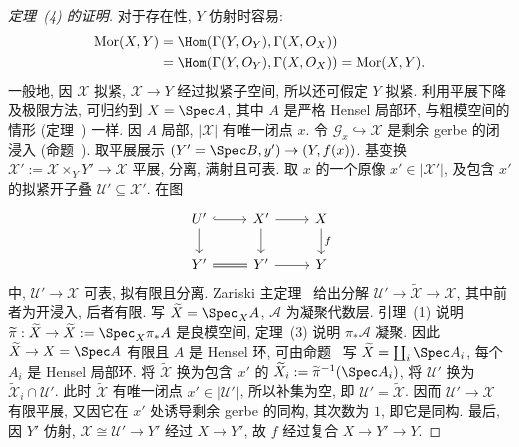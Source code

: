 \begin{proof}[定理~(4) 的证明]
对于存在性, $Y$ 仿射时容易:
\begin{align*}
\operatorname{Mor}(X,Y)&=\Hom(\Gamma(Y,\mathcal O_Y),\Gamma(X,\mathcal O_X))\\
&=\Hom(\Gamma(Y,\mathcal O_Y),\Gamma(\mathcal X,\mathcal O_{\mathcal X}))=\operatorname{Mor}(\mathcal X,Y).
\end{align*}
一般地, 因 $\mathcal X$ 拟紧, $\mathcal X\to Y$ 经过拟紧子空间, 所以还可假定 $Y$ 拟紧. 利用平展下降及极限方法, 可归约到 $X=\Spec A$, 其中 $A$ 是严格 Hensel 局部环, 与粗模空间的情形 (定理~) 一样. 因 $A$ 局部, $|\mathcal X|$ 有唯一闭点 $x$. 令 $\mathcal G_x\hookrightarrow\mathcal X$ 是剩余 gerbe 的闭浸入 (命题~). 取平展展示 $(Y'=\Spec B,y')\to(Y,f(x))$. 基变换 $\mathcal X':=\mathcal X\times_YY'\to\mathcal X$ 平展, 分离, 满射且可表. 取 $x$ 的一个原像 $x'\in|\mathcal X'|$, 及包含 $x'$ 的拟紧开子叠 $\mathcal U'\subseteq\mathcal X'$. 在图
\begin{align*}
\begin{tikzcd}[ampersand replacement=\&]
\mathcal U'\arrow[r,hook]\arrow[d]\&\mathcal X'\arrow[r]\arrow[d]\&\mathcal X\arrow[d,"{f}"]\\
Y'\arrow[r,equal]\&Y'\arrow[r]\&Y
\end{tikzcd}
\end{align*}
中, $\mathcal U'\to\mathcal X$ 可表, 拟有限且分离. Zariski 主定理~ 给出分解 $\mathcal U'\to\widetilde{\mathcal X}\to\mathcal X$, 其中前者为开浸入, 后者有限. 写 $\widetilde{\mathcal X}=\Spec_{\mathcal X}\mathcal A$, $\mathcal A$ 为凝聚代数层. 引理~(1) 说明 $\widetilde\pi:\widetilde{\mathcal X}\to\widetilde X:=\Spec_X\pi_*\mathcal A$ 是良模空间, 定理~(3) 说明 $\pi_*\mathcal A$ 凝聚. 因此 $\widetilde X\to X=\Spec A$ 有限且 $A$ 是 Hensel 环, 可由命题~ 写 $\widetilde X=\coprod_i\Spec A_i$, 每个 $A_i$ 是 Hensel 局部环. 将 $\widetilde{\mathcal X}$ 换为包含 $x'$ 的 $\widetilde{\mathcal X}_i:=\widetilde\pi^{-1}(\Spec A_i)$, 将 $\mathcal U'$ 换为 $\widetilde{\mathcal X}_i\cap\mathcal U'$. 此时 $\widetilde{\mathcal X}$ 有唯一闭点 $x'\in|\mathcal U'|$, 所以补集为空, 即 $\mathcal U'=\widetilde{\mathcal X}$. 因而 $\mathcal U'\to\mathcal X$ 有限平展, 又因它在 $x'$ 处诱导剩余 gerbe 的同构, 其次数为 $1$, 即它是同构. 最后, 因 $Y'$ 仿射, $\mathcal X\cong\mathcal U'\to Y'$ 经过 $X\to Y'$, 故 $f$ 经过复合 $X\to Y'\to Y$.
\end{proof}

